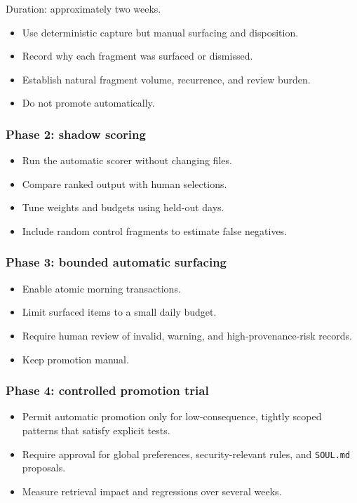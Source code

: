 \documentclass[11pt,a4paper]{article}
\begin{document}
Duration: approximately two weeks.

\begin{itemize}
  \item Use deterministic capture but manual surfacing and disposition.
  \item Record why each fragment was surfaced or dismissed.
  \item Establish natural fragment volume, recurrence, and review burden.
  \item Do not promote automatically.
\end{itemize}

\subsubsection{Phase 2: shadow scoring}

\begin{itemize}
  \item Run the automatic scorer without changing files.
  \item Compare ranked output with human selections.
  \item Tune weights and budgets using held-out days.
  \item Include random control fragments to estimate false negatives.
\end{itemize}

\subsubsection{Phase 3: bounded automatic surfacing}

\begin{itemize}
  \item Enable atomic morning transactions.
  \item Limit surfaced items to a small daily budget.
  \item Require human review of invalid, warning, and high-provenance-risk records.
  \item Keep promotion manual.
\end{itemize}

\subsubsection{Phase 4: controlled promotion trial}

\begin{itemize}
  \item Permit automatic promotion only for low-consequence, tightly scoped patterns that satisfy explicit tests.
  \item Require approval for global preferences, security-relevant rules, and \texttt{SOUL.md} proposals.
  \item Measure retrieval impact and regressions over several weeks.
\end{itemize}
\end{document}
